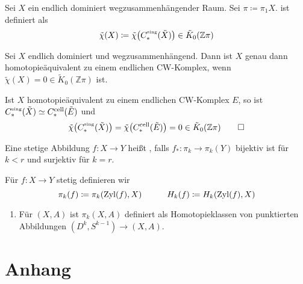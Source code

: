 \begin{definition}[{name=[{Walls Endlichkeitshindernis}]}]
	Sei $X$ ein endlich dominiert wegzusammenhängender Raum.
	Sei $\pi \coloneqq \pi_1 X$.
	 ist definiert als 
	\[
		\tilde{\chi}(X) \coloneqq \tilde{\chi} \enbrace*{C^\sing_*(\tilde{X})} \in \tilde{K}_0(\mathbb{Z} \pi)
	\]
\end{definition}

\begin{satz}[name={Wall}]
	Sei $X$ endlich dominiert und wegzusammenhängend.
	Dann ist $X$ genau dann homotopieäquivalent zu einem endlichen CW-Komplex, wenn $\tilde{\chi}(X)=0 \in \tilde{K}_0(\mathbb{Z}\pi)$ ist.
\end{satz}
\begin{beweis}[{name={der einfachen Richtung}}]
	Ist $X$ homotopieäquivalent zu einem endlichen CW-Komplex $E$, so ist $C^\sing_*(\tilde{X}) \simeq C^{\cell}_*(\tilde{E})$ und 
	\[
		\tilde{\chi} \enbrace*{C^\sing_*(\tilde{X})} = \tilde{\chi} \enbrace*{C^{\cell}_*(\tilde{E})} = 0 \in \tilde{K}_0(\mathbb{Z}\pi) \qedhere
	\]
\end{beweis}

\begin{definition}
	Eine stetige Abbildung $f \colon X \to Y$ heißt , falls $f_* \colon \pi_k \to \pi_k(Y)$ bijektiv ist für $k < r$ und surjektiv für $k =r$.
\end{definition}

\begin{definition}
	Für $f \colon X \to Y$ stetig definieren wir 
	\[
		\pi_k(f) \coloneqq \pi_k \enbrace*{\Zyl(f),X} \qquad \quad H_k(f) \coloneqq H_k \enbrace*{\Zyl(f),X}
	\]
\end{definition}

\begin{bemerkung}
	\begin{enumerate}[1)]
		\item Für $(X,A)$ ist $\pi_k(X,A)$ definiert als Homotopieklassen von punktierten Abbildungen $(D^k,S^{k-1}) \to (X,A)$.
	\end{enumerate}
\end{bemerkung}




\cleardoubleoddemptypage
{}
\setcounter{page}{1}
\cleardoubleoddemptypage
\appendix

\section{Anhang} %
\label{sec:anhang}

\printindex
\printbibliography
\listoffigures
\todototoc
{}


